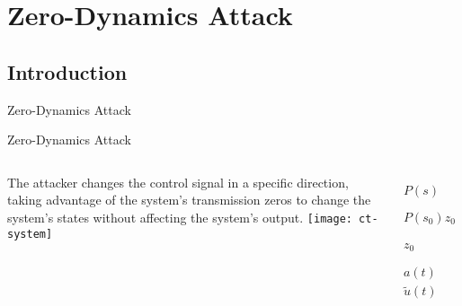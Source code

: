 
\section{Zero-Dynamics Attack}%
\label{sec:zda}

\subsection{Introduction}%
\label{subsec:ts-introduction}

\begin{slide}{}
  \vspace*{\fill}
  \begin{center}
    \textcolor{fg}{\Large{Zero-Dynamics Attack}}
  \end{center}
  \vspace*{\fill}
\end{slide}

\begin{slide}{Zero-Dynamics Attack}
  \begin{columns}[c]
    \begin{column}{0.48\textwidth}
      The attacker changes the control signal in a specific direction, taking
      advantage of the system's transmission zeros to change the system's states
      without affecting the system's output.
      \texttt{[image: ct-system]}
    \end{column}%
    \hfill%
    \begin{column}{0.48\textwidth}
      \begin{align}
        P(s)          & = \begin{bmatrix}
                            sI-A & -B \\
                            C    & D
                          \end{bmatrix},                                \\
        P(s_{0})z_{0} & = 0.                                            \\
        z_{0}         & = \begin{bmatrix} x_{0} \\ a_{0} \end{bmatrix}, \\
        a(t)          & = a_{0}e^{s_{0}t},                              \\
        \tilde{u}(t)  & =u(t) + a(t).
      \end{align}
    \end{column}%
  \end{columns}
\end{slide}

